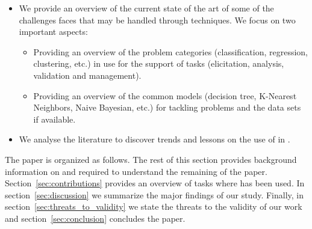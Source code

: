 \begin{itemize}
    \item We provide an overview of the current state of the art of some of the
    challenges \RE faces that may be handled through \ML techniques. We focus on
    two important aspects:
    \begin{itemize}
        \item Providing an overview of the \ML problem categories
        (classification, regression, clustering, etc.) in use for the support of
        \RE tasks (elicitation, analysis, validation and management).
        \item Providing an overview of the common \ML models (decision tree,
        K-Nearest Neighbors, Naive Bayesian, etc.) for tackling \RE problems and
        the data sets if available.
    \end{itemize}
    \item We analyse the literature to discover trends and lessons on the use of
    \ML in \RE.
\end{itemize}
The paper is organized as follows. The rest of this section provides
background information on \ML and \RE required to understand the remaining of
the paper. Section~\ref{sec:contributions} provides an overview of \RE tasks
where \ML has been used. In section~\ref{sec:discussion} we summarize the major
findings of our study. Finally, in section~\ref{sec:threats_to_validity} we
state the threats to the validity of our work and section~\ref{sec:conclusion}
concludes the paper.



